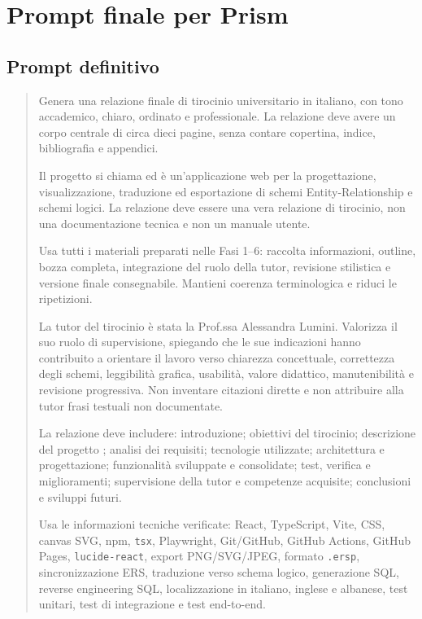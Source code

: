 
\chapter{Prompt finale per Prism}

\section{Prompt definitivo}

\begin{quote}\small
Genera una relazione finale di tirocinio universitario in italiano, con tono accademico, chiaro, ordinato e professionale. La relazione deve avere un corpo centrale di circa dieci pagine, senza contare copertina, indice, bibliografia e appendici.

Il progetto si chiama \builder{} ed è un'applicazione web per la progettazione, visualizzazione, traduzione ed esportazione di schemi Entity-Relationship e schemi logici. La relazione deve essere una vera relazione di tirocinio, non una documentazione tecnica e non un manuale utente.

Usa tutti i materiali preparati nelle Fasi 1--6: raccolta informazioni, outline, bozza completa, integrazione del ruolo della tutor, revisione stilistica e versione finale consegnabile. Mantieni coerenza terminologica e riduci le ripetizioni.

La tutor del tirocinio è stata la Prof.ssa Alessandra Lumini. Valorizza il suo ruolo di supervisione, spiegando che le sue indicazioni hanno contribuito a orientare il lavoro verso chiarezza concettuale, correttezza degli schemi, leggibilità grafica, usabilità, valore didattico, manutenibilità e revisione progressiva. Non inventare citazioni dirette e non attribuire alla tutor frasi testuali non documentate.

La relazione deve includere: introduzione; obiettivi del tirocinio; descrizione del progetto \builder; analisi dei requisiti; tecnologie utilizzate; architettura e progettazione; funzionalità sviluppate e consolidate; test, verifica e miglioramenti; supervisione della tutor e competenze acquisite; conclusioni e sviluppi futuri.

Usa le informazioni tecniche verificate: React, TypeScript, Vite, CSS, canvas SVG, npm, \texttt{tsx}, Playwright, Git/GitHub, GitHub Actions, GitHub Pages, \texttt{lucide-react}, export PNG/SVG/JPEG, formato \texttt{.ersp}, sincronizzazione ERS, traduzione verso schema logico, generazione SQL, reverse engineering SQL, localizzazione in italiano, inglese e albanese, test unitari, test di integrazione e test end-to-end.


\end{quote}
